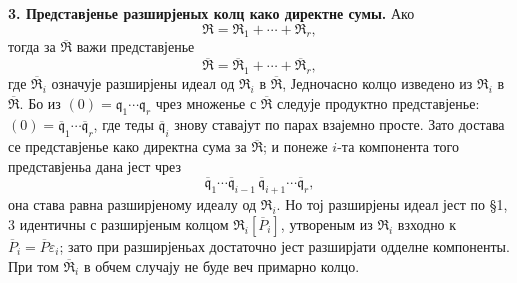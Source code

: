 \documentclass[11pt]{article}
\begin{document}
\setcounter{footnote}{20}

\textbf{3. Представјенье разширјеных колц како директне сумы.} Ако
\[
   \mathfrak R=\mathfrak R_1+\cdots+\mathfrak R_r,
\]
тогда за $\overline{\mathfrak R}$ важи представјенье
\[
   \overline{\mathfrak R}=\overline{\mathfrak R}_1+\cdots+\overline{\mathfrak R}_r,
\]
где $\overline{\mathfrak R}_i$ означује разширјены идеал од $\mathfrak R_i$ в $\overline{\mathfrak R}$, Једночасно колцо изведено из $\mathfrak R_i$ в $\overline{\mathfrak R}$. Бо из $(0)=\mathfrak q_1\cdots\mathfrak q_r$ чрез множенье с $\overline{\mathfrak R}$ следује продуктно представјенье: $(0)=\overline{\mathfrak q}_1\cdots\overline{\mathfrak q}_r$, где теды $\overline{\mathfrak q}_i$ знову ставајут по парах взајемно просте. Зато достава се представјенье како директна сума за $\overline{\mathfrak R}$; и понеже $i$-та компонента того представјеньа дана јест чрез
\[
   \overline{\mathfrak q}_1\cdots\overline{\mathfrak q}_{i-1}\,
   \overline{\mathfrak q}_{i+1}\cdots\overline{\mathfrak q}_r,
\]
она става равна разширјеному идеалу од $\mathfrak R_i$. Но тој разширјены идеал јест по \S 1, 3 идентичны с разширјеным колцом $\mathfrak R_i[\overline P_i]$, утвореным из $\mathfrak R_i$ взходно к $\overline P_i=\overline P\varepsilon_i$; зато при разширјеньах достаточно јест разширјати одделне компоненты. При том $\overline{\mathfrak R}_i$ в обчем случају не буде веч примарно колцо.
\end{document}
